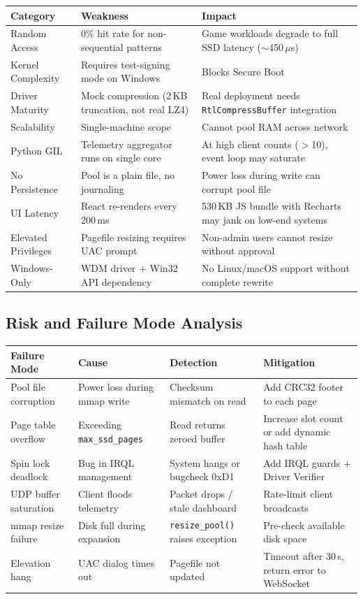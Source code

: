 \documentclass[11pt,a4paper]{article}
\newcommand{\code}[1]{\texttt{#1}}
\newcommand{\micro}{$\mu$}
\begin{document}
\begin{longtable}{p{3cm}p{3.5cm}p{7cm}}
\toprule
\textbf{Category} & \textbf{Weakness} & \textbf{Impact} \\
\midrule
\endhead
Random Access & 0\% hit rate for non-sequential patterns & Game workloads degrade to full SSD latency ($\sim$450\,\micro{}s) \\
Kernel Complexity & Requires test-signing mode on Windows & Blocks Secure Boot \\
Driver Maturity & Mock compression (2\,KB truncation, not real LZ4) & Real deployment needs \code{RtlCompressBuffer} integration \\
Scalability & Single-machine scope & Cannot pool RAM across network \\
Python GIL & Telemetry aggregator runs on single core & At high client counts ($>$10), event loop may saturate \\
No Persistence & Pool is a plain file, no journaling & Power loss during write can corrupt pool file \\
UI Latency & React re-renders every 200\,ms & 530\,KB JS bundle with Recharts may jank on low-end systems \\
Elevated Privileges & Pagefile resizing requires UAC prompt & Non-admin users cannot resize without approval \\
Windows-Only & WDM driver + Win32 API dependency & No Linux/macOS support without complete rewrite \\
\bottomrule
\end{longtable}

\subsection{Risk and Failure Mode Analysis}

\begin{longtable}{p{3cm}p{3cm}p{3cm}p{5cm}}
\toprule
\textbf{Failure Mode} & \textbf{Cause} & \textbf{Detection} & \textbf{Mitigation} \\
\midrule
\endhead
Pool file corruption & Power loss during mmap write & Checksum mismatch on read & Add CRC32 footer to each page \\
Page table overflow & Exceeding \code{max\_ssd\_pages} & Read returns zeroed buffer & Increase slot count or add dynamic hash table \\
Spin lock deadlock & Bug in IRQL management & System hangs or bugcheck 0xD1 & Add IRQL guards + Driver Verifier \\
UDP buffer saturation & Client floods telemetry & Packet drops / stale dashboard & Rate-limit client broadcasts \\
mmap resize failure & Disk full during expansion & \code{resize\_pool()} raises exception & Pre-check available disk space \\
Elevation hang & UAC dialog times out & Pagefile not updated & Timeout after 30\,s, return error to WebSocket \\
\bottomrule
\end{longtable}
\end{document}
